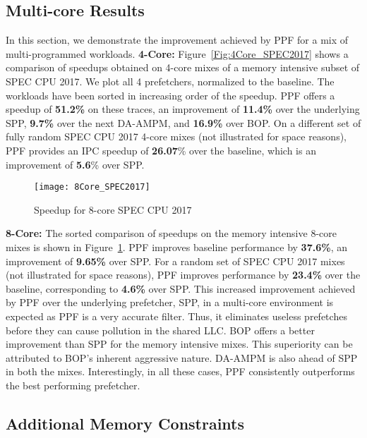 \subsection{Multi-core Results}
\label{Results-Multi}
\noindent In this section, we demonstrate the improvement achieved by PPF for a
mix of multi-programmed workloads.
\newline
\newline
\noindent \textbf{4-Core:} Figure~\ref{Fig:4Core_SPEC2017}
shows a comparison of speedups obtained on 4-core mixes of a memory
intensive subset of SPEC CPU 2017. We plot all 4 prefetchers, normalized
to the baseline. The workloads have been sorted in increasing order of
the speedup. PPF offers a speedup of \textbf{51.2\%} on these traces,
an improvement of \textbf{11.4\%} over the underlying SPP,
\textbf{9.7\%} over the next DA-AMPM, and \textbf{16.9\%} over BOP.
On a different set of fully random SPEC CPU 2017 4-core mixes (not
illustrated for space reasons), PPF provides an IPC speedup of
\textbf{26.07}\% over the
baseline, which is an improvement of \textbf{5.6}\% over SPP.
%
\begin{figure}[ht]
\texttt{[image: 8Core\_SPEC2017]}
\caption{Speedup for 8-core SPEC CPU 2017}
\label{Fig:8Core_SPEC2017}
\end{figure}
%
\newline
\newline
\noindent \textbf{8-Core:} The sorted comparison of speedups on the
memory intensive 8-core mixes is shown in
Figure~\ref{Fig:8Core_SPEC2017}.  PPF improves baseline performance by
\textbf{37.6\%}, an improvement of \textbf{9.65\%} over SPP. For a
random set of SPEC CPU 2017 mixes (not illustrated for space reasons),
PPF improves performance by \textbf{23.4\%} over the baseline,
corresponding to \textbf{4.6\%} over SPP. This increased improvement
achieved by PPF over the {underlying prefetcher, SPP,} 
in a multi-core environment is expected as PPF is a very accurate filter. 
Thus, it eliminates useless prefetches before they can cause pollution in the 
shared LLC. BOP offers a better improvement than SPP for the memory intensive
mixes. This superiority can be attributed to BOP's inherent aggressive
nature. DA-AMPM is also ahead of SPP in both the mixes. Interestingly,
in all these cases, PPF consistently outperforms the best performing
prefetcher.

\subsection{Additional Memory Constraints}
\label{Results-AdditionalMem}

